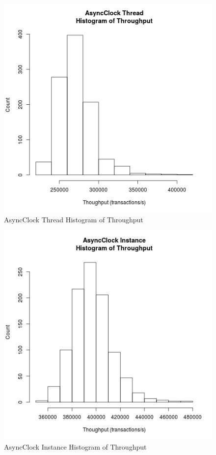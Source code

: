 \begin{figure}[H]
\center
\includegraphics[height=.4\textheight]{async_thread_throughput_hist.png}
\caption{AsyncClock Thread Histogram of Throughput}
\label{async_thread_throughput}
\end{figure}

\begin{figure}[H]
\center
\includegraphics[height=.4\textheight]{async_instance_throughput_hist.png}
\caption{AsyncClock Instance Histogram of Throughput}
\label{async_instance_throughput}
\end{figure}

